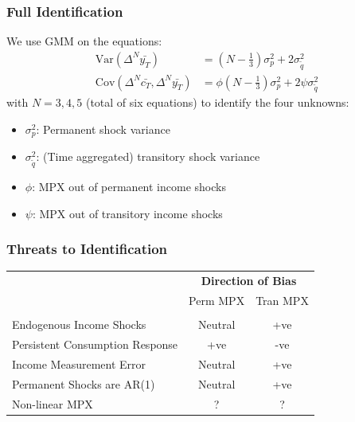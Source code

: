 \documentclass{beamer}
\begin{document}
\frame
{
	\frametitle{Full Identification}
We use GMM on the equations:
\begin{align*}
\mathrm{Var}(\Delta^N \bar{y_T} ) &=  (N-\frac{1}{3}) \sigma^2_p + 2  \sigma^2_{\tilde{q}} \\
\mathrm{Cov}(\Delta^N \bar{c_T},\Delta^N \bar{y_T} ) &= \phi (N-\frac{1}{3}) \sigma^2_p + 2 \psi \sigma^2_{\tilde{q}}
\end{align*}
with $N=3,4,5$ (total of six equations) to identify the four unknowns:
\begin{itemize}
	\item $\sigma^2_p$: Permanent shock variance
	\item $\sigma^2_{\tilde{q}}$: (Time aggregated) transitory shock variance
	\item $\phi$: MPX out of permanent income shocks
	\item $\psi$: MPX out of transitory income shocks
\end{itemize}
}
\frame
{
	\frametitle{Threats to Identification}
	\begin{minipage}{\textwidth}
		\begin{table}
			\label{table:sourcesofbias}
			\begin{tabular}{lcc}  
				\\ & \multicolumn{2}{c}{\textbf{Direction of Bias} }  
				\\ & Perm MPX & Tran MPX
				\\ \hline
				\\ Endogenous Income Shocks & Neutral & +ve
				\\ Persistent Consumption Response & +ve & -ve
				\\ Income Measurement Error &  Neutral & +ve
				\\ Permanent Shocks are AR(1) & Neutral & +ve
				\\ Non-linear MPX	& ? & ?
			\end{tabular}
		\end{table}
	\end{minipage}
}
\end{document}
